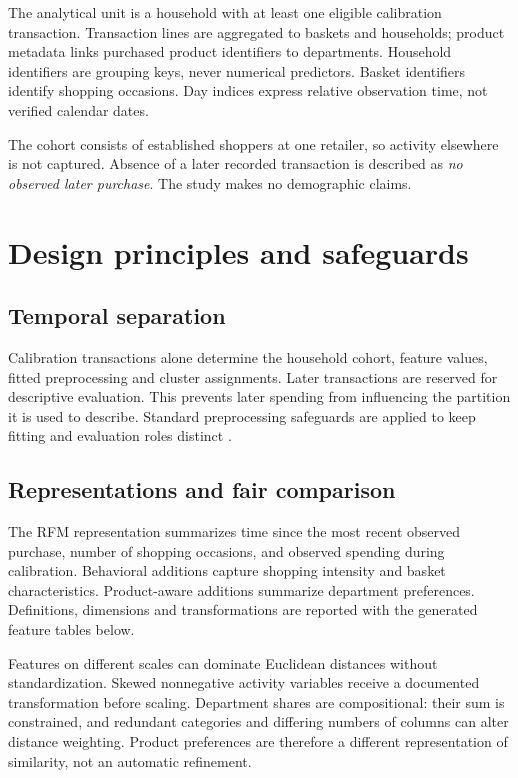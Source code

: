 The analytical unit is a household with at least one eligible calibration transaction. Transaction lines are aggregated to baskets and households; product metadata links purchased product identifiers to departments. Household identifiers are grouping keys, never numerical predictors. Basket identifiers identify shopping occasions. Day indices express relative observation time, not verified calendar dates.

The cohort consists of established shoppers at one retailer, so activity elsewhere is not captured. Absence of a later recorded transaction is described as \emph{no observed later purchase}. The study makes no demographic claims.

\section{Design principles and safeguards}
\subsection{Temporal separation}
Calibration transactions alone determine the household cohort, feature values, fitted preprocessing and cluster assignments. Later transactions are reserved for descriptive evaluation. This prevents later spending from influencing the partition it is used to describe. Standard preprocessing safeguards are applied to keep fitting and evaluation roles distinct \cite{sklearnpitfalls}.

\subsection{Representations and fair comparison}
The RFM representation summarizes time since the most recent observed purchase, number of shopping occasions, and observed spending during calibration. Behavioral additions capture shopping intensity and basket characteristics. Product-aware additions summarize department preferences. Definitions, dimensions and transformations are reported with the generated feature tables below.

Features on different scales can dominate Euclidean distances without standardization. Skewed nonnegative activity variables receive a documented transformation before scaling. Department shares are compositional: their sum is constrained, and redundant categories and differing numbers of columns can alter distance weighting. Product preferences are therefore a different representation of similarity, not an automatic refinement.


